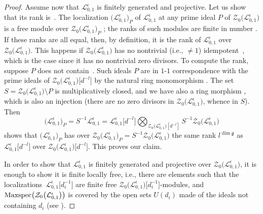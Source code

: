 \documentclass[10pt,a4paper]{amsart}
\numberwithin{equation}{section}
\theoremstyle{definition}
\newcommand{\e}{\epsilon}
\newcommand{\Ll}{{\mathcal L}}
\newcommand{\ra}{\rightarrow}
\begin{document}
\begin{proof}
Assume now that $\Ll_{0,1}^\e$ is finitely generated and projective. Let us show that its rank is~. The localization $\bigl(\Ll_{0,1}^\e\bigr)_P$ of $\Ll_{0,1}^\e$ at any prime ideal $P$ of $\mathcal{Z}_0\bigl(\Ll_{0,1}^\e\bigr)$ is a free module over $\mathcal{Z}_0\bigl(\Ll_{0,1}^\e\bigr)_P$ \cite[Proposition~2.12.15]{Rowen}; the ranks of such modules are finite in number \cite[Proposition~2.12.20]{Rowen}. If these ranks are all equal, then, by definition, it is the rank of $\Ll_{0,1}^\e$ over $\mathcal{Z}_0\bigl(\Ll_{0,1}^\e\bigr)$. This happens if $\mathcal{Z}_0\bigl(\Ll_{0,1}^\e\bigr)$ has no nontrivial (i.e., $\ne 1$) idempotent~\cite[Corollary~2.12.23]{Rowen}, which is the case since it has no nontrivial zero divisors. To compute the rank, suppose $P$ does not contain~. Such ideals $P$ are in $1$-$1$ correspondence with the prime ideals of $\mathcal{Z}_0\bigl(\Ll_{0,1}^\e\bigr)\big[d^{-l}\big]$ by the natural ring monomorphism \smash{$\mathcal{Z}_0\bigl(\Ll_{0,1}^\e\bigr) \ra \mathcal{Z}_0\bigl(\Ll_{0,1}^\e\bigr)\big[d^{-l}\big]$}. The set~${S = \mathcal{Z}_0\bigl(\Ll_{0,1}^\e\bigr)\setminus P}$ is multiplicatively closed, and we have also a ring morphism \smash{$\mathcal{Z}_0\bigl(\Ll_{0,1}^\e\bigr)\big[d^{-l}\big] \ra S^{-1}\mathcal{Z}_0\bigl(\Ll_{0,1}^\e\bigr)$}, which is also an injection (there are no zero divisors in $\mathcal{Z}_0\bigl(\Ll_{0,1}^\e\bigr)$, whence in $S$). Then
\[%
\bigl(\Ll_{0,1}^\e\bigr)_P = S^{-1}\Ll_{0,1}^\e = \Ll_{0,1}^\e\big[d^{-l}\big] \bigotimes_{\mathcal{Z}_0\bigl(\Ll_{0,1}^\e\bigr)[d^{-l}]} S^{-1}\mathcal{Z}_0\bigl(\Ll_{0,1}^\e\bigr)
\]
shows that $\bigl(\Ll_{0,1}^\e\bigr)_P$ has over $\mathcal{Z}_0\bigl(\Ll_{0,1}^\e\bigr)_P = S^{-1}\mathcal{Z}_0\bigl(\Ll_{0,1}^\e\bigr)$ the same rank $l^{\dim \mathfrak{g}}$ as $\Ll_{0,1}^\e\big[d^{-l}\big]$ over $\mathcal{Z}_0\bigl(\Ll_{0,1}^\e\bigr)\big[d^{-l}\big]$. This proves our claim.

In order to show that $\Ll_{0,1}^\e$ is finitely generated and projective over $\mathcal{Z}_0\bigl(\Ll_{0,1}^\e\bigr)$, it is enough to show it is finite locally free, i.e., there are elements \smash{$d_i\in \mathcal{Z}_0\bigl(\Ll_{0,1}^\e\bigr)$} such that the localizations~${\Ll_{0,1}^\e\big[d_i^{-1}\big]}$ are finite free $\mathcal{Z}_0\bigl(\Ll_{0,1}^\e\bigr)\big[d_i^{-1}\big]$-modules, and ${\rm Maxspec}\bigl(\mathcal{Z}_0\bigl(\Ll_{0,1}^\e\bigr)\bigl)$ is covered by the open sets $U(d_i)$ made of the ideals not containing $d_i$ (see \cite[Lemma~77.2]{StackP}).


\end{proof}
\end{document}
